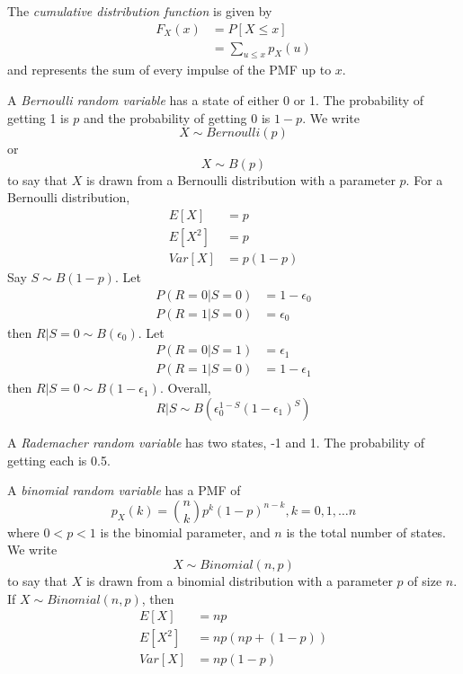 The \emph{cumulative distribution function} is given by
\begin{align}
    F_X(x) & = P\left[X \leq x\right] \\
           & = \sum_{u \leq x} p_X(u)
\end{align}
and represents the sum of every impulse
of the PMF up to $x$.

A \emph{Bernoulli random variable} has a state
of either 0 or 1. The probability of getting 1 is $p$ and
the probability of getting 0 is $1 - p$. We write
\begin{equation}
    X \sim Bernoulli(p)
\end{equation}
or
\begin{equation}
    X \sim B(p)
\end{equation}
to say that $X$ is drawn from a Bernoulli distribution
with a parameter $p$. For a Bernoulli distribution,
\begin{align}
    E[X]   & = p        \\
    E[X^2] & = p        \\
    Var[X] & = p(1 - p)
\end{align}
Say $S \sim B(1-p)$.
Let
\begin{align}
    P(R=0|S=0) & = 1 - \epsilon_0 \\
    P(R=1|S=0) & = \epsilon_0
\end{align}
then $R|S=0 \sim B(\epsilon_0)$.
Let
\begin{align}
    P(R=0|S=1) & = \epsilon_1     \\
    P(R=1|S=0) & = 1 - \epsilon_1
\end{align}
then $R|S=0 \sim B(1 - \epsilon_1)$.
Overall,
\begin{equation}
    R|S \sim B(\epsilon_0^{1-S}(1-\epsilon_1)^S)
\end{equation}

A \emph{Rademacher random variable} has two states, -1 and 1.
The probability of getting each is 0.5.

A \emph{binomial random variable} has a PMF of
\begin{equation}
    p_X(k) = {n\choose k} p^k (1 - p)^{n - k}, k = 0, 1, \dots n
\end{equation}
where $0 < p < 1$ is the binomial parameter, and $n$ is the total
number of states. We write
\begin{equation}
    X \sim Binomial(n, p)
\end{equation}
to say that $X$ is drawn from a binomial distribution with a
parameter $p$ of size $n$.
If $X \sim Binomial(n, p)$, then
\begin{align}
    E[X]   & = np               \\
    E[X^2] & = np(np + (1 - p)) \\
    Var[X] & = np(1 - p)
\end{align}

